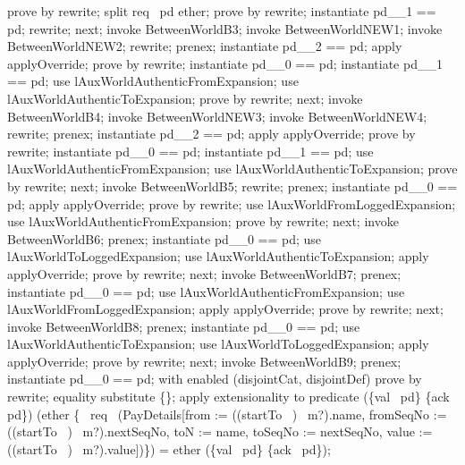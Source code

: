 \begin{LPScript}
\begin{zproof}[lPromotedBetweenWorldStartToType]
            prove by rewrite;
            split req~ pd \in ether;
            prove by rewrite;
            instantiate pd\_\_1 == pd;
            rewrite;
    next;
        invoke BetweenWorldB3;
        invoke BetweenWorldNEW1;
        invoke BetweenWorldNEW2;
        rewrite;
        prenex;
        instantiate pd\_\_2 == pd;
        apply applyOverride;
        prove by rewrite;
        instantiate pd\_\_0 == pd;
        instantiate pd\_\_1 == pd;
        use lAuxWorldAuthenticFromExpansion;
        use lAuxWorldAuthenticToExpansion;
        prove by rewrite;
    next;
        invoke BetweenWorldB4;
        invoke BetweenWorldNEW3;
        invoke BetweenWorldNEW4;
        rewrite;
        prenex;
        instantiate pd\_\_2 == pd;
        apply applyOverride;
        prove by rewrite;
        instantiate pd\_\_0 == pd;
        instantiate pd\_\_1 == pd;
        use lAuxWorldAuthenticFromExpansion;
        use lAuxWorldAuthenticToExpansion;
        prove by rewrite;
    next;
        invoke BetweenWorldB5;
        rewrite;
        prenex;
        instantiate pd\_\_0 == pd;
        apply applyOverride;
        prove by rewrite;
        use lAuxWorldFromLoggedExpansion;
        use lAuxWorldAuthenticFromExpansion;
        prove by rewrite;
    next;
        invoke BetweenWorldB6;
        prenex;
        instantiate pd\_\_0 == pd;
        use lAuxWorldToLoggedExpansion;
        use lAuxWorldAuthenticToExpansion;
        apply applyOverride;
        prove by rewrite;
    next;
        invoke BetweenWorldB7;
        prenex;
        instantiate pd\_\_0 == pd;
        use lAuxWorldAuthenticFromExpansion;
        use lAuxWorldFromLoggedExpansion;
        apply applyOverride;
        prove by rewrite;
    next;
        invoke BetweenWorldB8;
        prenex;
        instantiate pd\_\_0 == pd;
        use lAuxWorldAuthenticToExpansion;
        use lAuxWorldToLoggedExpansion;
        apply applyOverride;
        prove by rewrite;
    next;
        invoke BetweenWorldB9;
        prenex;
        instantiate pd\_\_0 == pd;
        with enabled (disjointCat, disjointDef) prove by rewrite;
        equality substitute \{\};
        apply extensionality to predicate
            (\{val~ pd\} \cup \{ack~ pd\}) \cap (ether \cup \{~
                req~ (\theta PayDetails[from := ((startTo~ \inv)~ m?).name,
                    fromSeqNo := ((startTo~ \inv)~ m?).nextSeqNo, 
                    toN := name, toSeqNo := nextSeqNo,
                    value := ((startTo~ \inv)~ m?).value])\})
            = ether \cap (\{val~ pd\} \cup \{ack~ pd\});

\end{zproof}
\end{LPScript}
